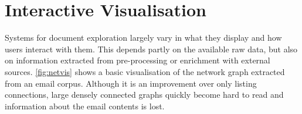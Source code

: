 
% 




\section{Interactive Visualisation}
Systems for document exploration largely vary in what they display and how users interact with them.
This depends partly on the available raw data, but also on information extracted from pre-processing or enrichment with external sources.
\ref{fig:netvis} shows a basic visualisation of the network graph extracted from an email corpus.
Although it is an improvement over only listing connections, large densely connected graphs quickly become hard to read and information about the email contents is lost.

